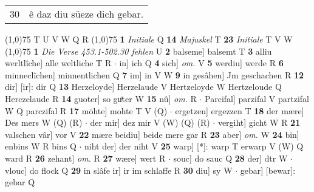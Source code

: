 \documentclass[8pt,a4paper,notitlepage]{article}
\begin{document}
\begin{table}[ht]
\begin{minipage}[t]{0.5\linewidth}
\begin{tabular}{rl}
30 & ê daz diu süeze dich gebar.\\ 
\end{tabular}
\scriptsize
\line(1,0){75} \newline
T U V W Q R \newline
\line(1,0){75} \newline
\textbf{1} \textit{Initiale} Q  \textbf{14} \textit{Majuskel} T  \textbf{23} \textit{Initiale} T V W  \newline
\line(1,0){75} \newline
\textbf{1} \textit{Die Verse 453.1-502.30 fehlen} U  \textbf{2} balseme] balsemt T \textbf{3} alliu werltlîche] alle weltliche T R  $\cdot$ in] ich Q \textbf{4} sich] \textit{om.} V \textbf{5} werdiu] werde R \textbf{6} minneclîchen] minnentlichen Q \textbf{7} im] in V W \textbf{9} in gesâhen] Jm geschachen R \textbf{12} dir] [ir]: dir Q \textbf{13} Herzeloyde] Herzelaude V Hertzeloyde W Hertzeloude Q Herczelaude R \textbf{14} guoter] so guͦter W \textbf{15} nû] \textit{om.} R  $\cdot$ Parcifal] parzifal V partzifal W Q parczifal R \textbf{17} möhte] mohte T V (Q)  $\cdot$ ergetzen] ergezzen T \textbf{18} der mære] Des mers W (Q) (R)  $\cdot$ der mir] dez mir V (W) (Q) (R)  $\cdot$ vergiht] gicht W R \textbf{21} valschen vâr] vor V \textbf{22} mære beidiu] beide mere gar R \textbf{23} aber] \textit{om.} W \textbf{24} bin] enbins W R bins Q  $\cdot$ niht der] der niht V \textbf{25} warp] [*]: warp T erwarp V (W) Q ward R \textbf{26} zehant] \textit{om.} R \textbf{27} wære] wert R  $\cdot$ souc] do sauc Q \textbf{28} der] dtr W  $\cdot$ vlouc] do flock Q \textbf{29} in slâfe ir] ir im schlaffe R \textbf{30} diu] sy W  $\cdot$ gebar] [bewar]: gebar Q \newline
\end{minipage}
\end{table}
\end{document}
